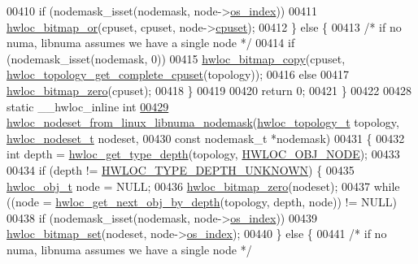 \begin{DoxyCode}
00410       \textcolor{keywordflow}{if} (nodemask\_isset(nodemask, node->\hyperlink{a00016_a61a7a80a68eaccbaaa28269e678c81a9}{os_index}))
00411         \hyperlink{a00065_ga1ba1de709ee9a7cf5cc8ad2d9a1a81d4}{hwloc_bitmap_or}(cpuset, cpuset, node->\hyperlink{a00016_a67925e0f2c47f50408fbdb9bddd0790f}{cpuset});
00412   \} \textcolor{keywordflow}{else} \{
00413     \textcolor{comment}{/* if no numa, libnuma assumes we have a single node */}
00414     \textcolor{keywordflow}{if} (nodemask\_isset(nodemask, 0))
00415       \hyperlink{a00065_gab14743355fa03b36cef521cbcd2fbf64}{hwloc_bitmap_copy}(cpuset, \hyperlink{a00060_ga418ebb39eaf1eac8f9cf4047cf59a534}{hwloc_topology_get_complete_cpuset}(topology));
00416     \textcolor{keywordflow}{else}
00417       \hyperlink{a00065_ga6c540b9fe63b8223b6aba46d56dd63b8}{hwloc_bitmap_zero}(cpuset);
00418   \}
00419 
00420   \textcolor{keywordflow}{return} 0;
00421 \}
00422 
00428 \textcolor{keyword}{static} \_\_hwloc\_inline \textcolor{keywordtype}{int}
\hypertarget{a00034_source_l00429}{}\hyperlink{a00070_ga22862f485346ae3b2ab7d052f538fc5f}{00429} \hyperlink{a00070_ga22862f485346ae3b2ab7d052f538fc5f}{hwloc_nodeset_from_linux_libnuma_nodemask}(\hyperlink{a00039_ga9d1e76ee15a7dee158b786c30b6a6e38}{hwloc_topology_t} topology, 
      \hyperlink{a00040_ga37e35730fa7e775b5bb0afe893d6d508}{hwloc_nodeset_t} nodeset,
00430                                           \textcolor{keyword}{const} nodemask\_t *nodemask)
00431 \{
00432   \textcolor{keywordtype}{int} depth = \hyperlink{a00046_gaea7c64dd59467f5201ba87712710b14d}{hwloc_get_type_depth}(topology, \hyperlink{a00041_ggacd37bb612667dc437d66bfb175a8dc55aaf0964881117bdedf1a5e9332cd120dd}{HWLOC_OBJ_NODE});
00433 
00434   \textcolor{keywordflow}{if} (depth != \hyperlink{a00046_ggaf4e663cf42bbe20756b849c6293ef575a0565ab92ab72cb0cec91e23003294aad}{HWLOC_TYPE_DEPTH_UNKNOWN}) \{
00435     \hyperlink{a00016}{hwloc_obj_t} node = NULL;
00436     \hyperlink{a00065_ga6c540b9fe63b8223b6aba46d56dd63b8}{hwloc_bitmap_zero}(nodeset);
00437     \textcolor{keywordflow}{while} ((node = \hyperlink{a00053_gab7c1dce3f42ece5bfa621e87cf332418}{hwloc_get_next_obj_by_depth}(topology, depth, node)) != NULL)
00438       \textcolor{keywordflow}{if} (nodemask\_isset(nodemask, node->\hyperlink{a00016_a61a7a80a68eaccbaaa28269e678c81a9}{os_index}))
00439         \hyperlink{a00065_ga497556af0cc34f109ae0277999c074d3}{hwloc_bitmap_set}(nodeset, node->\hyperlink{a00016_a61a7a80a68eaccbaaa28269e678c81a9}{os_index});
00440   \} \textcolor{keywordflow}{else} \{
00441     \textcolor{comment}{/* if no numa, libnuma assumes we have a single node */}

\end{DoxyCode}

